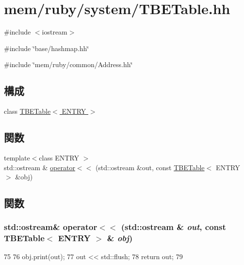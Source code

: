 \hypertarget{TBETable_8hh}{
\section{mem/ruby/system/TBETable.hh}
\label{TBETable_8hh}
}
{\ttfamily \#include $<$iostream$>$}\par
{\ttfamily \#include \char`\"{}base/hashmap.hh\char`\"{}}\par
{\ttfamily \#include \char`\"{}mem/ruby/common/Address.hh\char`\"{}}\par
\subsection*{構成}
\begin{DoxyCompactItemize}
\item 
class \hyperlink{classTBETable}{TBETable$<$ ENTRY $>$}
\end{DoxyCompactItemize}
\subsection*{関数}
\begin{DoxyCompactItemize}
\item 
{\footnotesize template$<$class ENTRY $>$ }\\std::ostream \& \hyperlink{TBETable_8hh_a3fdebad238838a8e58ac97e592eb5ce7}{operator$<$$<$} (std::ostream \&out, const \hyperlink{classTBETable}{TBETable}$<$ ENTRY $>$ \&obj)
\end{DoxyCompactItemize}


\subsection{関数}
\hypertarget{TBETable_8hh_a3fdebad238838a8e58ac97e592eb5ce7}{
\subsubsection[{operator$<$$<$}]{\setlength{\rightskip}{0pt plus 5cm}std::ostream\& operator$<$$<$ (std::ostream \& {\em out}, \/  const {\bf TBETable}$<$ ENTRY $>$ \& {\em obj})}}
\label{TBETable_8hh_a3fdebad238838a8e58ac97e592eb5ce7}



\begin{DoxyCode}
75 {
76     obj.print(out);
77     out << std::flush;
78     return out;
79 }
\end{DoxyCode}
